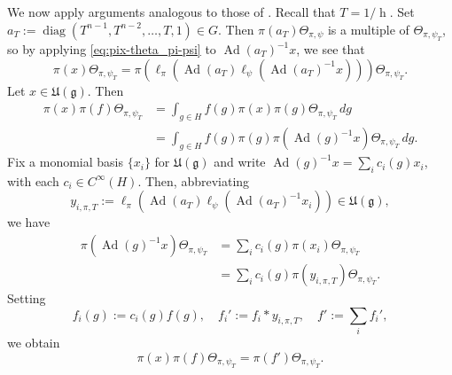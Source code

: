 \documentclass[reqno]{amsart}
\DeclareMathOperator{\Ad}{Ad}
\DeclareMathOperator{\h}{h}
\DeclareMathOperator{\diag}{diag}
\theoremstyle{plain} \newtheorem{theorem} {Theorem}
\theoremstyle{definition} \newtheorem{definition} [theorem] {Definition}
\theoremstyle{itplain} %
\numberwithin{equation}{section}
\numberwithin{theorem}{section}
\begin{document}
We now apply arguments analogous to those of \cite[Proof of Lemma 5]{MR2733072}.  Recall that $T = 1/\h$.  Set $a_T := \diag(T^{n-1}, T^{n-2}, \dotsc, T, 1) \in G$.  Then $\pi(a_T) \Theta_{\pi,\psi}$ is a multiple of $\Theta_{\pi,\psi_T}$, so by applying \eqref{eq:pix-theta_pi-psi} to $\Ad(a_T)^{-1} x$, we see that
\begin{equation*}
  \pi(x) \Theta_{\pi,\psi_T} = \pi (\ell_\pi(\Ad(a_T) \ell_\psi(\Ad(a_T)^{-1} x))) \Theta_{\pi,\psi_T}.
\end{equation*}
Let $x \in \mathfrak{U}(\mathfrak{g})$.  Then
\begin{align*}
  \pi(x) \pi(f) \Theta_{\pi,\psi_T} &= \int_{g \in H} f(g) \pi(x) \pi(g) \Theta_{\pi,\psi_T} \, d g \\
  &= \int_{g \in H} f(g) \pi(g) \pi(\Ad(g)^{-1}  x) \Theta_{\pi,\psi_T} \, d g.
\end{align*}
Fix a monomial basis $\{x_i\}$ for $\mathfrak{U}(\mathfrak{g})$ and write $\Ad(g)^{-1} x = \sum_i c_i(g) x_i$, with each $c_i \in C^\infty(H)$.   Then, abbreviating
\begin{equation*}
  y_{i,\pi,T} :=  \ell_\pi(\Ad(a_T) \ell_\psi(\Ad(a_T)^{-1} x_i)) \in \mathfrak{U}(\mathfrak{g}),
\end{equation*}
we have
\begin{align*}
  \pi(\Ad(g)^{-1}  x) \Theta_{\pi,\psi_T}
  &=
  \sum_i c_i(g) \pi(x_i) \Theta_{\pi,\psi_T} \\
  &=
  \sum_i
  c_i(g) \pi (y_{i,\pi,T}) \Theta_{\pi,\psi_T}.
\end{align*}
Setting
\begin{equation*}
  f_i(g) := c_i(g) f(g), \quad
  f_i' := f_i \ast y_{i,\pi,T},
  \quad
  f' := \sum_i f_i',
\end{equation*}
we obtain
\begin{equation}\label{eq:pix-pif-theta_pi}
  \pi(x) \pi(f) \Theta_{\pi,\psi_T} = \pi(f') \Theta_{\pi,\psi_T}.
\end{equation}
\end{document}
